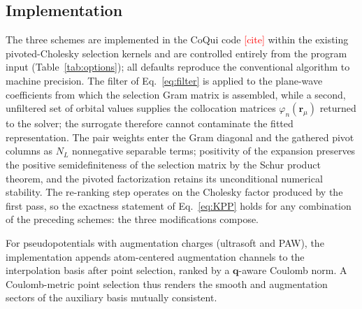 \documentclass[aps,prb,twocolumn,superscriptaddress,amsmath,amssymb]{revtex4-2}
\newcommand{\rr}{\mathbf{r}}
\newcommand{\qq}{\mathbf{q}}
\newcommand{\todo}[1]{\textcolor{red}{[#1]}}
\begin{document}
\subsection{Implementation}
\label{sec:implementation}

The three schemes are implemented in the CoQui code \todo{cite} within the
existing pivoted-Cholesky selection kernels and are controlled entirely
from the program input (Table~\ref{tab:options}); all defaults reproduce
the conventional algorithm to machine precision. The filter of
Eq.~\eqref{eq:filter} is applied to the plane-wave coefficients from which
the selection Gram matrix is assembled, while a second, unfiltered set of
orbital values supplies the collocation matrices
$\varphi_n(\rr_\mu)$ returned to the solver; the surrogate therefore cannot
contaminate the fitted representation. The pair weights enter the Gram
diagonal and the gathered pivot columns as $N_L$ nonnegative separable
terms; positivity of the expansion preserves the positive semidefiniteness
of the selection matrix by the Schur product theorem, and the pivoted
factorization retains its unconditional numerical stability. The
re-ranking step operates on the Cholesky factor produced by the first
pass, so the exactness statement of Eq.~\eqref{eq:KPP} holds for any
combination of the preceding schemes: the three modifications compose.

For pseudopotentials with augmentation charges (ultrasoft and PAW), the
implementation appends atom-centered augmentation channels to the
interpolation basis after point selection, ranked by a
$\qq$-aware Coulomb norm. A Coulomb-metric point selection thus renders
the smooth and augmentation sectors of the auxiliary basis mutually
consistent.
\end{document}
